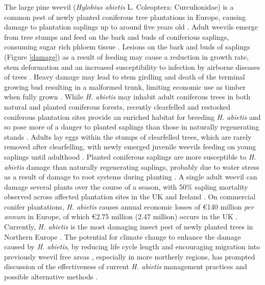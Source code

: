 \documentclass[a4paper, 11pt]{article}
\newcommand{\textapprox}{\raisebox{0.5ex}{\texttildelow}}
\begin{document}
The large pine weevil (\textit{Hylobius abietis} L. Coleoptera: Curculionidae) is a common pest of newly planted coniferous tree plantations in Europe, causing damage to plantation saplings up to around five years old \citep{Ordlander1997}. Adult weevils emerge from tree stumps and feed on the bark and buds of coniferious saplings, consuming sugar rich phloem tissue \citep{Nordlander1991}. Lesions on the bark and buds of saplings (Figure \ref{damage}) as a result of feeding may cause a reduction in growth rate, stem deformation and an increased susceptibility to infection by airborne diseases of trees \citep{Leather1999}. Heavy damage may lead to stem girdling and death of the terminal growing bud resulting in a malformed trunk, limiting economic use as timber when fully grown \citep{Alfaro1989, Gill1992}. While \textit{H. abietis} may inhabit adult coniferous trees in both natural and planted coniferous forests, recently clearfelled and restocked coniferous plantation sites provide an enriched habitat for breeding \textit{H. abietis} and so pose more of a danger to planted saplings than those in naturally regenerating stands \citep{Willoughby2004, Orlander1999}. Adults lay eggs within the stumps of clearfelled trees, which are rarely removed after clearfelling, with newly emerged juvenile weevils feeding on young saplings until adulthood \citep{Willoughby2004}. Planted coniferous saplings are more susceptible to \textit{H. abietis} damage than naturally regenerating saplings, probably due to water stress as a result of damage to root systems during planting \citep{Selander1990}. A single adult weevil can damage several plants over the course of a season, with \textapprox{}50\% sapling mortality observed across affected plantation sites in the UK and Ireland \citep{Heritage2001}. On commercial conifer plantations, \textit{H. abietis} causes annual economic losses of \euro{}140 million \textit{per annum} in Europe, of which \euro{}2.75 million (\textapprox{}\textsterling{}2.47 million) occurs in the UK \citep{Evans2015}. Currently, \textit{H. abietis} is the most damaging insect pest of newly planted trees in Northern Europe \citep{Evans2015}. The potential for climate change to enhance the damage caused by \textit{H. abietis}, by reducing life cycle length \citep{Leather1999} and encouraging migration into previously weevil free areas \citep{Inward2012, Barredo2015}, especially in more northerly regions, has prompted discussion of the effectiveness of current \textit{H. abietis} management practices and possible alternative methods \citep{Kapranas2017, McNamara2018}.
\end{document}
